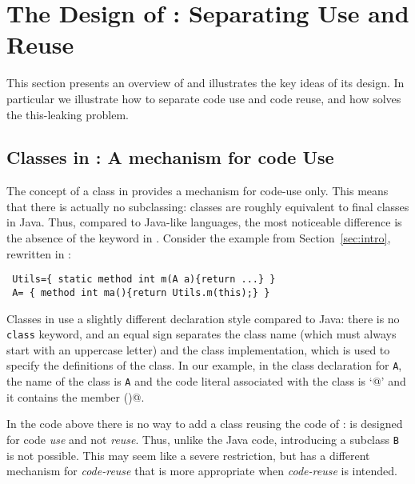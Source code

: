 \saveSpace\saveSpace\saveSpace
\section{The Design of \name: Separating Use and Reuse}\label{sec:separate}
\saveSpace\saveSpace\saveSpace
This section presents an overview of \name and illustrates the
key ideas of its design. In particular we illustrate how to separate code use and 
code reuse, and how \name solves the this-leaking problem.

\saveSpace\saveSpace
\subsection{Classes in \name: A mechanism for code Use}
\saveSpace
The concept of a class in \name provides a mechanism for code-use
only. This means that there is actually no subclassing:
classes are roughly equivalent to final classes in Java.  Thus,
compared to Java-like languages, the most noticeable difference is the
absence of the \Q@extends@ keyword in \name. 
Consider the example from Section~\ref{sec:intro}, rewritten in \name:
\saveSpace
\begin{lstlisting}
 Utils={ static method int m(A a){return ...} }
 A= { method int ma(){return Utils.m(this);} }
\end{lstlisting} 
\saveSpace
\noindent Classes in \name use a slightly different declaration style compared
to Java: there is no \lstinline{class} keyword, and an equal sign separates the class name (which must always start with
an uppercase letter) and the class implementation, which is used to specify the
definitions of the class. In our example, in the class declaration
for \lstinline{A}, the name of the class is \lstinline{A} and the code 
literal associated with the class is `@' and it contains the member  \Q@ma()@.


In the \name code above there is no way to add a class 
\Q@B@ reusing the code of \Q@A@: \Q@A@ is designed for code \emph{use} and not \emph{reuse}.
Thus, unlike the Java code, introducing a subclass
\lstinline{B} is not possible. This may seem like a severe restriction, but
\name has a different mechanism for \emph{code-reuse} that 
is more appropriate when \emph{code-reuse} is intended. 

